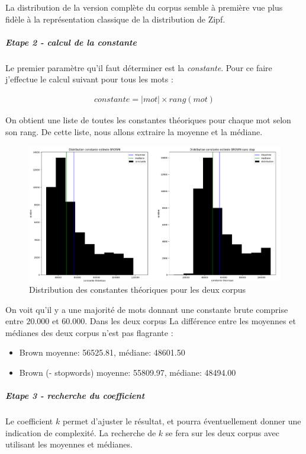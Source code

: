 \documentclass[a4paper,12pt]{article}
\begin{document}
    		La distribution de la version complète du corpus semble à première vue plus fidèle à la représentation classique de la distribution de Zipf. 
			
		\subparagraph{Etape 2 - calcul de la constante}
			Le premier paramètre qu'il faut déterminer est la \emph{constante}. Pour ce faire j'effectue le calcul suivant pour tous les mots :
			
			\begin{align*}
				constante = |mot| \times rang(mot)
			\end{align*}
			
			On obtient une liste de toutes les constantes théoriques pour chaque mot selon son rang.
			De cette liste, nous allons extraire la moyenne et la médiane.
			
			\begin{figure}[H]
				\includegraphics[width=\linewidth]{img/distribContTh.png}
				\caption{Distribution des constantes théoriques pour les deux corpus}
			\end{figure}
			
			On voit qu'il y a une majorité de mots donnant une constante brute comprise entre $20.000$ et $60.000$. Dans les deux corpus
			La différence entre les moyennes et médianes des deux corpus n'est pas flagrante :
			\begin{itemize}
				\item Brown moyenne: 56525.81, médiane: 48601.50
				\item Brown (- stopwords) moyenne: 55809.97, médiane: 48494.00
			\end{itemize}


		\subparagraph{Etape 3 - recherche du coefficient}
			Le coefficient $k$ permet d'ajuster le résultat, et pourra éventuellement donner une indication de complexité. La recherche de $k$ se fera sur les deux corpus avec utilisant les moyennes et médianes.\\
			
\end{document}

